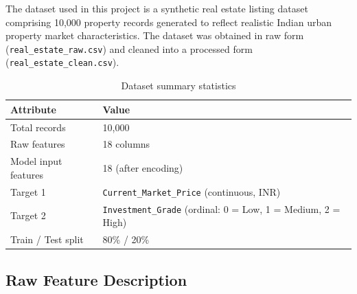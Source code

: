 \documentclass[12pt,a4paper]{article}
\begin{document}
The dataset used in this project is a synthetic real estate listing dataset comprising 10,000 property records generated to reflect realistic Indian urban property market characteristics. The dataset was obtained in raw form (\texttt{real\_estate\_raw.csv}) and cleaned into a processed form (\texttt{real\_estate\_clean.csv}).

\begin{table}[H]
\centering
\caption{Dataset summary statistics}
\begin{tabularx}{\linewidth}{lX}
\toprule
\textbf{Attribute} & \textbf{Value} \\
\midrule
Total records          & 10,000 \\
Raw features           & 18 columns \\
Model input features   & 18 (after encoding) \\
Target 1               & \texttt{Current\_Market\_Price} (continuous, INR) \\
Target 2               & \texttt{Investment\_Grade} (ordinal: 0 = Low, 1 = Medium, 2 = High) \\
Train / Test split     & 80\% / 20\% \\
\bottomrule
\end{tabularx}
\end{table}

\subsection{Raw Feature Description}
\end{document}

